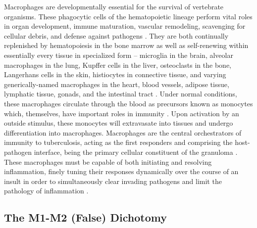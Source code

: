 Macrophages are developmentally essential for the survival of vertebrate organisms. These phagocytic cells of the hematopoietic lineage perform vital roles in organ development, immune maturation, vascular remodeling, scavenging for cellular debris, and defense against pathogens \citep{Wynn2013, Wattrus2022}. They are both continually replenished by hematopoiesis in the bone marrow as well as self\hyp{}renewing within essentially every tissue in specialized form -- microglia in the brain, alveolar macrophages in the lung, Kupffer cells in the liver, osteoclasts in the bone, Langerhans cells in the skin, histiocytes in connective tissue, and varying generically\hyp{}named macrophages in the heart, blood vessels, adipose tissue, lymphatic tissue, gonads, and the intestinal tract \citep{Davies2013a, Na2019, Bain2018}. Under normal conditions, these macrophages circulate through the blood as precursors known as monocytes which, themselves, have important roles in immunity \citep{Sampath2018, Mass2018}. Upon activation by an outside stimulus, these monocytes will extravasate into tissues and undergo differentiation into macrophages. Macrophages are the central orchestrators of immunity to tuberculosis, acting as the first responders and comprising the host\hyp{}pathogen interface, being the primary cellular constituent of the granuloma \citep{Pagan2018}. These macrophages must be capable of both initiating and resolving inflammation, finely tuning their responses dynamically over the course of an insult in order to simultaneously clear invading pathogens and limit the pathology of inflammation \citep{Watanabe2019, Murray2011, Unanue1987}.

\subsection{The M1\hyp{}M2 (False) Dichotomy}\label{lies}

